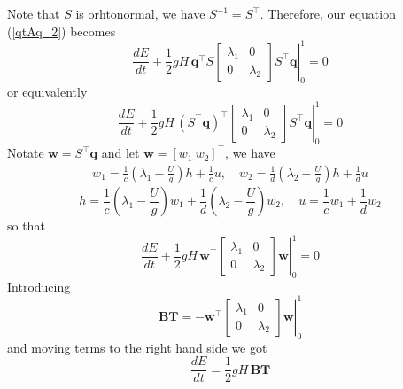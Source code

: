 \documentclass{article}
\newcommand{\half}{\frac{1}{2}}
\theoremstyle{definition}
\begin{document}
    Note that $S$ is orhtonormal, we have $S^{-1} = S^\top $. 
    Therefore, our equation (\ref{qtAq_2}) becomes  
    \begin{equation}
        \frac{d{E}}{dt} + \left. \half gH \,
        \mathbf{q}^\top S
        \begin{bmatrix}
             \lambda_1 &  0 \\
             0 &  \lambda_2
        \end{bmatrix}S^\top\mathbf{q}\right\vert_0^1 = 0
    \end{equation}
    or equivalently
    \begin{equation}
        \frac{d{E}}{dt} + \left. \half gH \,
        (S^\top\mathbf{q})^\top
        \begin{bmatrix}
            \lambda_1 &  0 \\
            0 &  \lambda_2
       \end{bmatrix}S^\top\mathbf{q}\right\vert_0^1 = 0
    \end{equation}
    Notate $\mathbf{w} = S^\top \mathbf{q}$ and let $\mathbf{w} = [w_1 \ w_2]^\top$, 
    we have 
    \begin{align}\label{eq:w-to-q}
        w_1 = \frac{1}{c}\left(\lambda_1 -\frac{ U}{g}\right) h + \frac{1}{c} u, \quad  w_2 = \frac{1}{d}\left(\lambda_2 -\frac{ U}{g}\right) h + \frac{1}{d} u
    \end{align}
    \begin{equation}\label{eq:q-to-w}
        h = \frac{1}{c}\left(\lambda_1 -\frac{ U}{g}\right) w_1 +  \frac{1}{d}\left(\lambda_2 -\frac{ U}{g}\right) w_2, \quad  u = \frac{1}{c} w_1 + \frac{1}{d} w_2
    \end{equation}
    so that 
    \begin{equation}
        \frac{d{E}}{dt} + \left. \half gH \,
        \mathbf{w}^\top
        \begin{bmatrix}
            \lambda_1 &  0 \\
            0 &  \lambda_2
       \end{bmatrix}\mathbf{w}\right\vert_0^1 = 0
    \end{equation}
    Introducing
    \begin{equation}
        \textbf{BT} = - 
        \left.\mathbf{w}^\top
        \begin{bmatrix}
            \lambda_1 &  0 \\
            0 &  \lambda_2
       \end{bmatrix}
        \mathbf{w}\right\vert_0^1
    \end{equation}
    and moving terms to the right hand side we got
    \begin{equation}
        \frac{d{E}}{dt} = \half gH \, \textbf{BT}
    \end{equation}
    
\end{document}
